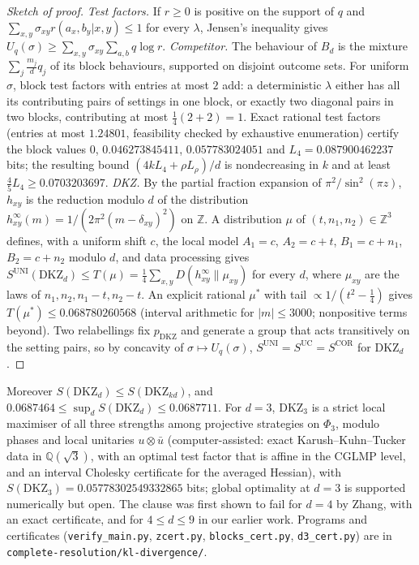 \documentclass[11pt]{amsart}
\theoremstyle{definition}
\theoremstyle{remark}
\numberwithin{equation}{section}
\newcommand{\Z}{\mathbb{Z}}
\newcommand{\Q}{\mathbb{Q}}
\newcommand{\DKZ}{\mathrm{DKZ}}
\begin{document}
\begin{proof}[Sketch of proof]
\emph{Test factors.} If $r\ge0$ is positive on the support of $q$ and $\sum_{x,y}\sigma_{xy}r(a_x,b_y|x,y)\le1$ for every
$\lambda$, Jensen's inequality gives $U_q(\sigma)\ge\sum_{x,y}\sigma_{xy}\sum_{a,b}q\log r$. \emph{Competitor.} The
behaviour of $B_d$ is the mixture $\sum_j\frac{m_j}dq_j$ of its block behaviours, supported on disjoint outcome sets.
For uniform $\sigma$, block test factors with entries at most $2$ add: a deterministic $\lambda$ either has all its
contributing pairs of settings in one block, or exactly two diagonal pairs in two blocks, contributing at most
$\frac14(2+2)=1$. Exact rational test factors (entries at most $1.24801$, feasibility checked by exhaustive enumeration)
certify the block values $0$, $0.046273845411$, $0.057783024051$ and $L_4=0.087900462237$ bits; the resulting bound
$(4kL_4+\rho L_\rho)/d$ is nondecreasing in $k$ and at least $\frac45L_4\ge0.0703203697$. \emph{DKZ.} By the partial
fraction expansion of $\pi^2/\sin^2(\pi z)$, $h_{xy}$ is the reduction modulo $d$ of the distribution
$h^\infty_{xy}(m)=1/(2\pi^2(m-\delta_{xy})^2)$ on $\Z$. A distribution $\mu$ of $(t,n_1,n_2)\in\Z^3$ defines, with a
uniform shift $c$, the local model $A_1=c$, $A_2=c+t$, $B_1=c+n_1$, $B_2=c+n_2$ modulo $d$, and data processing gives
$S^{\mathrm{UNI}}(\DKZ_d)\le T(\mu)=\frac14\sum_{x,y}D(h^\infty_{xy}\|\mu_{xy})$ for every $d$, where $\mu_{xy}$ are the
laws of $n_1,n_2,n_1-t,n_2-t$. An explicit rational $\mu^*$ with tail $\propto1/(t^2-\frac14)$ gives
$T(\mu^*)\le0.068780260568$ (interval arithmetic for $|m|\le3000$; nonpositive terms beyond). Two relabellings fix
$p_{\DKZ}$ and generate a group that acts transitively on the setting pairs, so by concavity of $\sigma\mapsto U_q(\sigma)$,
$S^{\mathrm{UNI}}=S^{\mathrm{UC}}=S^{\mathrm{COR}}$ for $\DKZ_d$.
\end{proof}

Moreover $S(\DKZ_d)\le S(\DKZ_{kd})$, and $0.0687464\le\sup_dS(\DKZ_d)\le0.0687711$. For $d=3$, $\DKZ_3$ is a strict
local maximiser of all three strengths among projective strategies on $\Phi_3$, modulo phases and local unitaries
$u\otimes\bar u$ (computer-assisted: exact Karush--Kuhn--Tucker data in $\Q(\sqrt3)$, with an optimal test factor that is
affine in the CGLMP level, and an interval Cholesky certificate for the averaged Hessian), with
$S(\DKZ_3)=0.05778302549332865$ bits; global optimality at $d=3$ is supported numerically but open. The clause was
first shown to fail for $d=4$ by Zhang\cite{Zhang}, with an exact certificate, and for $4\le d\le9$ in our earlier
work\cite{repo}. Programs and certificates (\texttt{verify\_main.py}, \texttt{zcert.py}, \texttt{blocks\_cert.py},
\texttt{d3\_cert.py}) are in \texttt{complete-resolution/kl-divergence/}.
\end{document}
